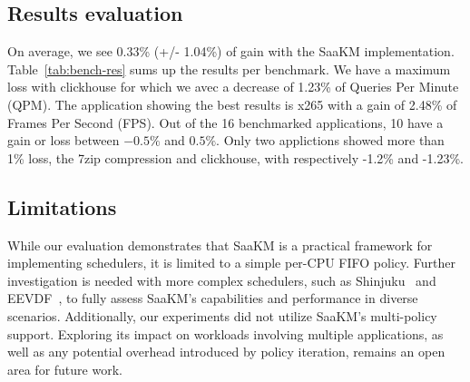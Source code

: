 
\subsection{Results evaluation}
On average, we see 0.33\% (+/- 1.04\%) of gain with the SaaKM implementation. Table~\ref{tab:bench-res} sums up the results per benchmark. We have a maximum loss with clickhouse for which we avec a decrease of 1.23\% of Queries Per Minute (QPM). The application showing the best results is x265 with a gain of 2.48\% of Frames Per Second (FPS). Out of the 16 benchmarked applications, 10 have a gain or loss between $-0.5\%$ and $0.5\%$. 
\parspace
Only two applictions showed more than 1\% loss, the 7zip compression and clickhouse, with respectively -1.2\% and -1.23\%. 

\subsection{Limitations}
While our evaluation demonstrates that SaaKM is a practical framework for implementing schedulers, it is limited to a simple per-CPU FIFO policy. Further investigation is needed with more complex schedulers, such as Shinjuku~\cite{shinjuku} and EEVDF~\cite{eevdf}, to fully assess SaaKM's capabilities and performance in diverse scenarios.
\parspace
Additionally, our experiments did not utilize SaaKM's multi-policy support. Exploring its impact on workloads involving multiple applications, as well as any potential overhead introduced by policy iteration, remains an open area for future work.

